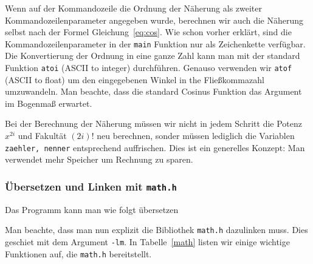 Wenn auf der Kommandozeile die Ordnung der Näherung als zweiter Kommandozeilenparameter angegeben wurde, berechnen wir auch die Näherung selbst nach der Formel Gleichung~\ref{eq:cos}.
Wie schon vorher erklärt, sind die Kommandozeilenparameter in der \texttt{main} Funktion nur als Zeichenkette verfügbar.
Die Konvertierung der Ordnung in eine ganze Zahl kann man mit der standard Funktion \texttt{atoi} (ASCII to integer) durchführen.
Genauso verwenden wir \texttt{atof} (ASCII to float) um den eingegebenen Winkel in the Fließkommazahl umzuwandeln.
Man beachte, dass die standard Cosinus Funktion das Argument im Bogenmaß erwartet.

Bei der Berechnung der Näherung müssen wir nicht in jedem Schritt die Potenz $x^{2i}$ und Fakultät $(2i)!$ neu berechnen, sonder müssen lediglich die Variablen \texttt{zaehler, nenner} entsprechend auffrischen.
Dies ist ein generelles Konzept: Man verwendet mehr Speicher um Rechnung zu sparen.

\subsubsection{Übersetzen und Linken mit \texttt{math.h}}

Das Programm kann man wie folgt übersetzen

\vspace*{0.5cm}
\vspace*{0.5cm}

\noindent Man beachte, dass man nun explizit die Bibliothek \texttt{math.h} dazulinken muss.
Dies geschiet mit dem Argument \texttt{-lm}.
In Tabelle~\ref{math} listen wir einige wichtige Funktionen auf, die \texttt{math.h} bereitstellt.


